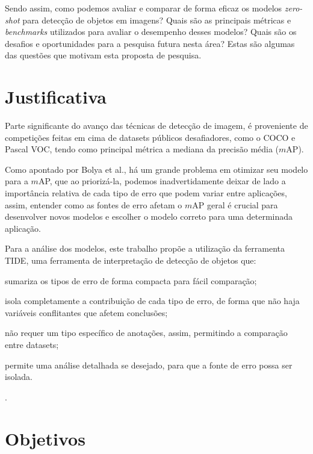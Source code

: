 \documentclass[openany, a4paper,12pt, oneside]{article}
\def\map{\(\mathit{m}\)AP}
\begin{document}
Sendo assim, como podemos avaliar e comparar de forma eficaz os modelos \textit{zero-shot} para detecção de objetos em imagens? Quais são as principais métricas e \textit{benchmarks} utilizados para avaliar o desempenho desses modelos? Quais são os desafios e oportunidades para a pesquisa futura nesta área? Estas são algumas das questões que motivam esta proposta de pesquisa.

\section{Justificativa}

Parte significante do avan\c{c}o das t\'{e}cnicas de detec\c{c}\~{a}o de imagem, \'{e} proveniente de competi\c{c}\~{o}es feitas em cima de datasets p\'{u}blicos desafiadores, como o COCO\cite{lin2015} e Pascal VOC\cite{everingham2010}, tendo como principal m\'{e}trica a mediana da precis\~{a}o m\'{e}dia (\map).

Como apontado por Bolya et al.\cite{tide}, h\'{a} um grande problema em otimizar seu modelo para a \map, que ao prioriz\'{a}-la, podemos inadvertidamente deixar de lado a import\^{a}ncia relativa de cada tipo de erro que podem variar entre aplica\c{c}\~{o}es, assim, entender como as fontes de erro afetam o {\map} geral \'{e} crucial para desenvolver novos modelos e escolher o modelo correto para uma determinada aplica\c{c}\~{a}o.

Para a an\'{a}lise dos modelos, este trabalho prop\~{o}e a utiliza\c{c}\~{a}o da ferramenta TIDE, uma ferramenta de interpreta\c{c}\~{a}o de detec\c{c}\~{a}o de objetos que:
\begin{inparaenum}[(i)]
  \item sumariza os tipos de erro de forma compacta para f\'{a}cil compara\c{c}\~{a}o;
  \item isola completamente a contribui\c{c}\~{a}o de cada tipo de erro, de forma que n\~{a}o haja vari\'{a}veis conflitantes que afetem conclus\~{o}es;
  \item n\~{a}o requer um tipo espec\'{i}fico de anota\c{c}\~{o}es, assim, permitindo a compara\c{c}\~{a}o entre datasets;
  \item permite uma an\'{a}lise detalhada se desejado, para que a fonte de erro possa ser isolada.
\end{inparaenum}
\cite{tide}.

\section{Objetivos}
\end{document}
